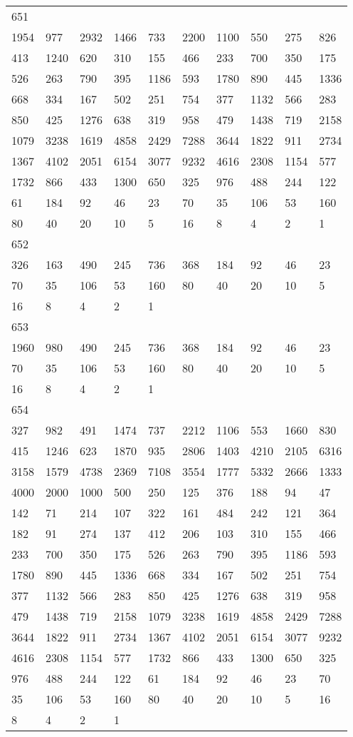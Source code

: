 \begin{longtable}{*{10}{l}}
651&&&&&&&&&\\
1954& 977& 2932& 1466& 733& 2200& 1100& 550& 275& 826\\
413& 1240& 620& 310& 155& 466& 233& 700& 350& 175\\
526& 263& 790& 395& 1186& 593& 1780& 890& 445& 1336\\
668& 334& 167& 502& 251& 754& 377& 1132& 566& 283\\
850& 425& 1276& 638& 319& 958& 479& 1438& 719& 2158\\
1079& 3238& 1619& 4858& 2429& 7288& 3644& 1822& 911& 2734\\
1367& 4102& 2051& 6154& 3077& 9232& 4616& 2308& 1154& 577\\
1732& 866& 433& 1300& 650& 325& 976& 488& 244& 122\\
61& 184& 92& 46& 23& 70& 35& 106& 53& 160\\
80& 40& 20& 10& 5& 16& 8& 4& 2& 1\\

652&&&&&&&&&\\
326& 163& 490& 245& 736& 368& 184& 92& 46& 23\\
70& 35& 106& 53& 160& 80& 40& 20& 10& 5\\
16& 8& 4& 2& 1& \\

653&&&&&&&&&\\
1960& 980& 490& 245& 736& 368& 184& 92& 46& 23\\
70& 35& 106& 53& 160& 80& 40& 20& 10& 5\\
16& 8& 4& 2& 1& \\

654&&&&&&&&&\\
327& 982& 491& 1474& 737& 2212& 1106& 553& 1660& 830\\
415& 1246& 623& 1870& 935& 2806& 1403& 4210& 2105& 6316\\
3158& 1579& 4738& 2369& 7108& 3554& 1777& 5332& 2666& 1333\\
4000& 2000& 1000& 500& 250& 125& 376& 188& 94& 47\\
142& 71& 214& 107& 322& 161& 484& 242& 121& 364\\
182& 91& 274& 137& 412& 206& 103& 310& 155& 466\\
233& 700& 350& 175& 526& 263& 790& 395& 1186& 593\\
1780& 890& 445& 1336& 668& 334& 167& 502& 251& 754\\
377& 1132& 566& 283& 850& 425& 1276& 638& 319& 958\\
479& 1438& 719& 2158& 1079& 3238& 1619& 4858& 2429& 7288\\
3644& 1822& 911& 2734& 1367& 4102& 2051& 6154& 3077& 9232\\
4616& 2308& 1154& 577& 1732& 866& 433& 1300& 650& 325\\
976& 488& 244& 122& 61& 184& 92& 46& 23& 70\\
35& 106& 53& 160& 80& 40& 20& 10& 5& 16\\
8& 4& 2& 1& \\


\end{longtable}
